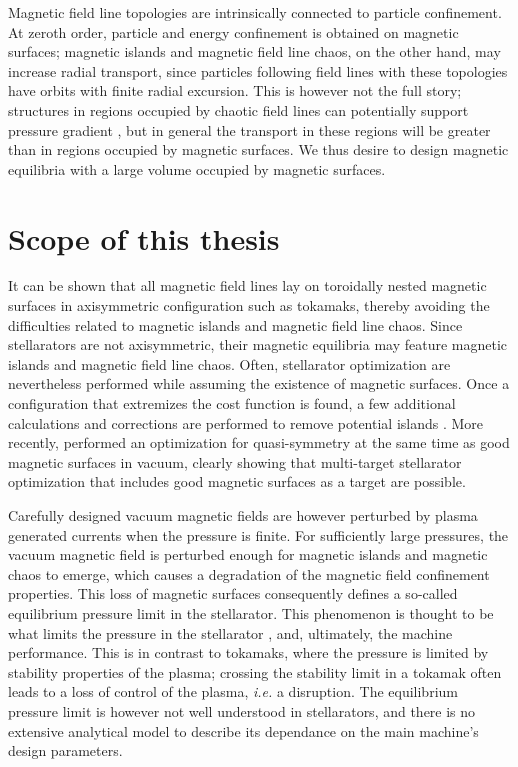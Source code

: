 \documentclass[my_thesis.tex]{subfiles}
\begin{document}
Magnetic field line topologies are intrinsically connected to particle confinement. At zeroth order, particle and energy confinement is obtained on magnetic surfaces; magnetic islands and magnetic field line chaos, on the other hand, may increase radial transport, since particles following field lines with these topologies have orbits with finite radial excursion. This is however not the full story; structures in regions occupied by chaotic field lines can potentially support pressure gradient \citep{Hudson2008}, but in general the transport in these regions will be greater than in regions occupied by magnetic surfaces. We thus desire to design magnetic equilibria with a large volume occupied by magnetic surfaces. 


\section{Scope of this thesis}


It can be shown \citep{gradHydromagneticEquilibriaForcefree1958,shafranovPlasmaEquilibriumMagnetic1966,Freidberg2014} that all magnetic field lines lay on toroidally nested magnetic surfaces in axisymmetric configuration such as tokamaks, thereby avoiding the difficulties related to magnetic islands and magnetic field line chaos. Since stellarators are not axisymmetric, their magnetic equilibria may feature magnetic islands and magnetic field line chaos. Often, stellarator optimization are nevertheless performed while assuming the existence of magnetic surfaces. Once a configuration that extremizes the cost function is found, a few additional calculations and corrections are performed to remove potential islands \citep{Hanson1984a,Cary1986}. More recently, \citet{Landreman2021a} performed an optimization for quasi-symmetry at the same time as good magnetic surfaces in vacuum, clearly showing that multi-target stellarator optimization that includes good magnetic surfaces as a target are possible.

Carefully designed vacuum magnetic fields are however perturbed by plasma generated currents when the pressure is finite. For sufficiently large pressures, the vacuum magnetic field is perturbed enough for magnetic islands and magnetic chaos to emerge, which causes a degradation of the magnetic field confinement properties. This loss of magnetic surfaces consequently defines a so-called equilibrium pressure limit in the stellarator. This phenomenon is thought to be what limits the pressure in the stellarator \citep{helanderTheoryPlasmaConfinement2014}, and, ultimately, the machine performance. This is in contrast to tokamaks, where the pressure is limited by stability properties of the plasma; crossing the stability limit in a tokamak often leads to a loss of control of the plasma, \textit{i.e.} a disruption. The equilibrium pressure limit is however not well understood in stellarators, and there is no extensive analytical model to describe its dependance on the main machine's design parameters. 
\end{document}
